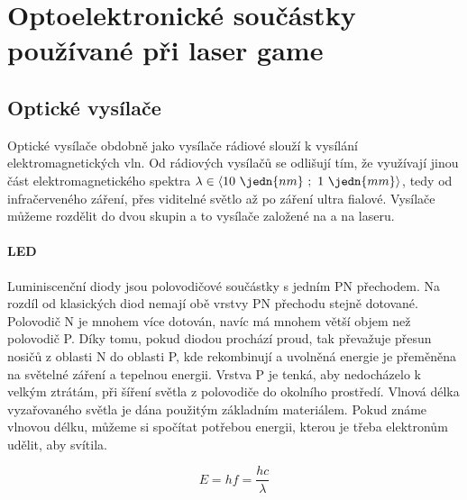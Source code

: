 \chapter{Optoelektronické součástky používané při laser game}

\section{Optické vysílače}
Optické vysílače obdobně jako vysílače rádiové slouží k vysílání elektromagnetických vln. Od rádiových vysílačů  se odlišují tím, že využívají jinou část elektromagnetického spektra $\lambda \in \langle 10~\jedn{nm}~;~1~\jedn{mm}  \rangle$, tedy od infračerveného záření, přes viditelné světlo až po záření ultra fialové. Vysílače můžeme rozdělit do dvou skupin a to vysílače založené na  a na laseru.

\subsubsection{LED}
Luminiscenční diody jsou polovodičové součástky s jedním PN přechodem. Na rozdíl od klasických diod nemají  obě vrstvy PN přechodu stejně dotované. Polovodič N je mnohem více dotován, navíc má mnohem větší objem než polovodič P. Díky tomu, pokud diodou prochází proud, tak převažuje přesun nosičů z oblasti N do oblasti P, kde rekombinují a uvolněná energie je přeměněna na světelné záření a tepelnou energii. Vrstva P je tenká, aby nedocházelo k velkým ztrátám, při šíření světla z polovodiče do okolního prostředí. Vlnová délka vyzařovaného světla je dána použitým základním materiálem. Pokud známe vlnovou délku, můžeme si spočítat potřebou energii, kterou je třeba elektronům udělit, aby  svítila.

$$ E = hf = \dfrac{hc}{\lambda} $$

